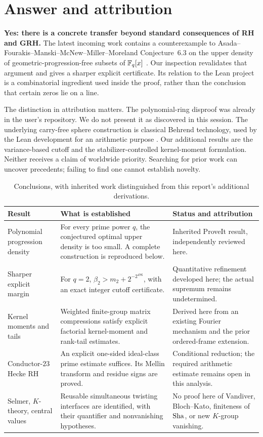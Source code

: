 \section{Answer and attribution}

\textbf{Yes: there is a concrete transfer beyond standard consequences of RH
and GRH.} The latest incoming work contains a counterexample to
Asada--Fourakis--Manski--McNew--Miller--Moreland Conjecture~6.3 on the upper
density of geometric-progression-free subsets of \(\mathbb F_q[x]\)
\cite{asada,priorDensity}. Our inspection revalidates that argument and gives
a sharper explicit certificate. Its relation to the Lean project is a
combinatorial ingredient used inside the proof, rather than the conclusion
that certain zeros lie on a line.

The distinction in attribution matters. The polynomial-ring disproof was
already in the user's repository. We do not present it as discovered in
this session. The underlying carry-free sphere construction is classical
Behrend technology, used by the Lean development for an arithmetic purpose
\cite{behrend,repo}. Our additional results are the variance-based cutoff
and the stabilizer-controlled kernel-moment formulation. Neither receives
a claim of worldwide priority. Searching for prior work can uncover
precedents; failing to find one cannot establish novelty.

\begin{table}[htbp]
\centering\small
\begin{tabularx}{\textwidth}{@{}p{}YY@{}}
\toprule
Result & What is established & Status and attribution\\
\midrule
Polynomial progression density &
For every prime power \(q\), the conjectured optimal upper density is too
small. A complete construction is reproduced below. &
Inherited ProveIt result, independently reviewed here.\\
\addlinespace
Sharper explicit margin &
For \(q=2\), \(\beta_2>m_2+2^{-2^{476}}\), with an exact integer cutoff
certificate. &
Quantitative refinement developed here; the actual supremum remains
undetermined.\\
\addlinespace
Kernel moments and tails &
Weighted finite-group matrix compressions satisfy explicit factorial
kernel-moment and rank-tail estimates. &
Derived here from an existing Fourier mechanism and the prior ordered-frame
extension.\\
\addlinespace
Conductor-\(23\) Hecke RH &
An explicit one-sided ideal-class prime estimate suffices. Its Mellin
transform and residue signs are proved. &
Conditional reduction; the required arithmetic estimate remains open in
this analysis.\\
\addlinespace
Selmer, \(K\)-theory, central values &
Reusable simultaneous twisting interfaces are identified, with their
quantifier and nonvanishing hypotheses. &
No proof here of Vandiver, Bloch--Kato, finiteness of \(\mathrm{Sha}\), or new
\(K\)-group vanishing.\\
\bottomrule
\end{tabularx}
\caption{Conclusions, with inherited work distinguished from this report's
additional derivations.}
\end{table}

